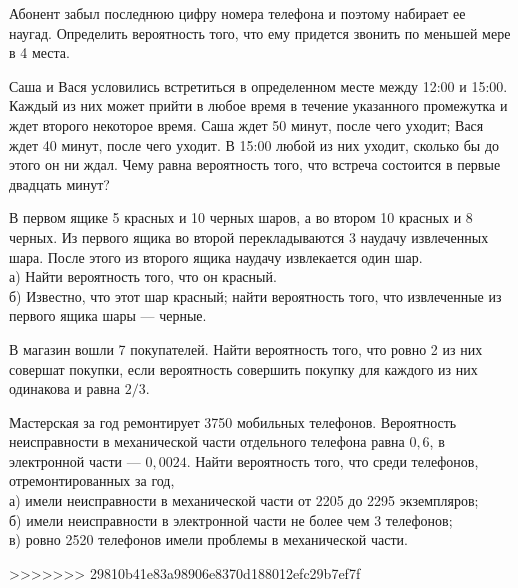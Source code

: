 \newpage\setcounter{zad}{0}



\begin{zkrW}{20}\noindent 
	Абонент забыл последнюю цифру номера телефона и поэтому набирает ее наугад. Определить вероятность того, что ему придется звонить по меньшей мере в 4 места.
 
\end{zkrW}

\begin{zkrW}{20}\noindent 
	Саша и Вася условились встретиться в определенном месте между 12:00 и 15:00. Каждый из них может прийти в любое время в течение указанного промежутка и ждет второго некоторое время. Саша ждет 50 минут, после чего уходит; Вася ждет 40 минут, после чего уходит. В 15:00 любой из них уходит, сколько бы до этого он ни ждал. Чему равна вероятность того, что встреча состоится в первые двадцать минут?
 
\end{zkrW}

\begin{zkrW}{20}\noindent 
	В первом ящике 5 красных и 10 черных шаров, а во втором 10 красных и 8 черных. Из первого ящика во второй перекладываются 3 наудачу извлеченных шара. После этого из второго ящика наудачу извлекается один шар. \\ \indent а) Найти вероятность того, что он красный. \\ \indent б) Известно, что этот шар красный; найти вероятность того, что извлеченные из первого ящика шары --- черные.
 
\end{zkrW}

\begin{zkrW}{20}\noindent 
	В магазин вошли 7 покупателей. Найти вероятность того, что ровно 2 из них совершат покупки, если вероятность совершить покупку для каждого из них одинакова и равна $2/3$.
 
\end{zkrW}

\begin{zkrW}{20}\noindent 
	Мастерская за год ремонтирует 3750 мобильных телефонов. Вероятность неисправности в механической части отдельного телефона равна $0{,}6$, в электронной части --- $0{,}0024$. Найти вероятность того, что среди телефонов, отремонтированных за год, \\ \indent а) имели неисправности в механической части от 2205 до 2295 экземпляров; \\ \indent б) имели неисправности в электронной части не более чем 3 телефонов; \\ \indent в) ровно 2520 телефонов имели проблемы в механической части.
 
\end{zkrW}

\newpage\setcounter{zad}{0}

>>>>>>> 29810b41e83a98906e8370d188012efc29b7ef7f
